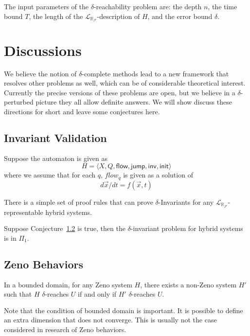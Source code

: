 \documentclass[envcountsect]{llncs}
\newcommand{\flow}{\mathsf{flow}}
\newcommand{\jump}{\mathsf{jump}}
\newcommand{\inv}{\mathsf{inv}}
\newcommand{\init}{\mathsf{init}}
\newcommand{\lrf}{\mathcal{L}_{\mathbb{R}_{\mathcal{F}}}}
\begin{document}
\begin{remark}
The input parameters of the $\delta$-reachability problem are: the depth $n$, the time bound $T$, the length of the $\lrf$-description of $H$, and the error bound $\delta$.
\end{remark}

\section{Discussions}\label{discuss}

We believe the notion of $\delta$-complete methods lead to a new framework that
resolves other problems as well, which can be of considerable theoretical
interest. Currently the precise versions of these problems are open, but we
believe in a $\delta$-perturbed picture they all allow definite answers. We
will show discuss these directions for short and leave some conjectures here.

\subsection{Invariant Validation}
Suppose the automaton is given as
$$H = \langle X, Q, \flow, \jump, \inv, \init \rangle$$
where we assume that for each $q$, $flow_q$ is given as a solution of
$$d\vec x/dt = f(\vec x, t)$$
\begin{definition}

\end{definition}

\begin{conjecture}
 There is a simple set of proof rules that can prove $\delta$-Invariants for
any $\lrf$-representable hybrid systems.
\end{conjecture}

\begin{proposition}
Suppose Conjecture~\ref{} is true, then the $\delta$-invariant problem for
hybrid systems is in $\Pi_1$.
\end{proposition}

\subsection{Zeno Behaviors}
\begin{conjecture}
In a bounded domain, for any Zeno system $H$, there exists a non-Zeno system
$H'$ such that $H$ $\delta$-reaches $U$ if and only if $H'$ $\delta$-reaches
$U$.
\end{conjecture}
Note that the condition of bounded domain is important. It is possible to
define an extra dimension that does not converge. This is usually not the case
considered in research of Zeno behaviors.
\end{document}
